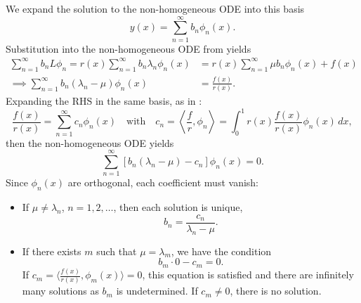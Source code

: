We expand the solution to the non-homogeneous ODE into this basis
\[
	y(x) = \sum_{n=1}^{\infty} b_n \phi_n(x).
\]
Substitution into the non-homogeneous ODE from  yields
\begin{align*}
	\sum_{n=1}^{\infty} b_n L \phi_n = r(x) \sum_{n=1}^{\infty} b_n \lambda_n \phi_n(x) &= r(x) \sum_{n=1}^{\infty} \mu b_n \phi_n(x) + f(x) \\
	\implies \sum_{n=1}^{\infty} b_n (\lambda_n - \mu) \phi_n(x) &= \frac{f(x)}{r(x)}.
\end{align*}
Expanding the RHS in the same basis, as in :
\[
	\frac{f(x)}{r(x)} = \sum_{n=1}^{\infty} c_n \phi_n(x) \quad\text{with}\quad c_n = \left\langle \frac{f}{r}, \phi_n \right\rangle = \int_0^1 r(x) \frac{f(x)}{r(x)} \phi_n(x) \,dx,
\]
then the non-homogeneous ODE yields
\[
	\sum_{n=1}^{\infty} [b_n(\lambda_n - \mu) - c_n] \phi_n(x) = 0.
\]
Since $\phi_n(x)$ are orthogonal, each coefficient must vanish:
\begin{itemize}
	\item If $\mu \neq \lambda_n$, $n = 1, 2, \ldots$, then each solution is unique,
	\[
		b_n = \frac{c_n}{\lambda_n - \mu}.
	\]
	\item If there exists $m$ such that $\mu = \lambda_m$, we have the condition
	\[
		b_m \cdot 0 - c_m = 0.
	\]
	If $c_m = \langle \frac{f(x)}{r(x)}, \phi_m(x)\rangle = 0$, this equation is satisfied and there are infinitely many solutions as $b_m$ is undetermined. If $c_m \neq 0$, there is no solution.
\end{itemize}


